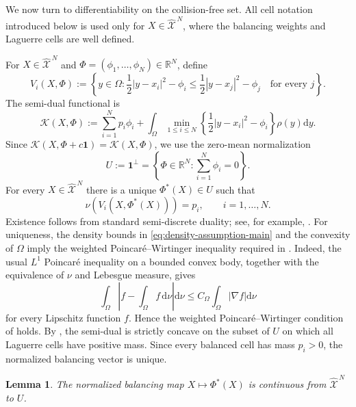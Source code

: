 \documentclass[11pt]{article}
\def\R{\mathbb{R}}
\def\Xc{{\mathcal X}}
\def\hX{\widehat{\Xc}^{\,N}}
\newcommand{\dd}{\mathrm{d}}
\newcommand{\one}{\mathbf 1}
\newcommand{\Kant}{\mathscr K}
\newtheorem{lemma}[theorem]{Lemma}
\theoremstyle{definition}
\theoremstyle{remark}
\numberwithin{equation}{section}
\begin{document}
We now turn to differentiability on the collision-free set.  All cell notation introduced below is
used only for $X\in\hX$, where the balancing weights and Laguerre cells are well defined.

For $X\in\hX$ and $\Phi=(\phi_1,\ldots,\phi_N)\in\R^N$, define
\begin{equation}\label{eq:laguerre-main}
 V_i(X,\Phi):=\left\{y\in\Omega:
 \frac12|y-x_i|^2-\phi_i
 \le\frac12|y-x_j|^2-\phi_j\quad\text{for every }j\right\}.
\end{equation}
The semi-dual functional is
\begin{equation}\label{eq:semi-dual-main}
 \Kant(X,\Phi):=\sum_{i=1}^Np_i\phi_i+
 \int_\Omega\min_{1\le i\le N}
 \left\{\frac12|y-x_i|^2-\phi_i\right\}\rho(y)\dd y.
\end{equation}
Since $\Kant(X,\Phi+c\one)=\Kant(X,\Phi)$, we use the zero-mean normalization
\begin{equation}\label{eq:gauge-main}
 U:=\one^\perp=\left\{\Phi\in\R^N:\sum_{i=1}^N\phi_i=0\right\}.
\end{equation}
For every $X\in\hX$ there is a unique $\Phi^*(X)\in U$ such that
\begin{equation}\label{eq:balanced-main}
 \nu(V_i(X,\Phi^*(X)))=p_i,
 \qquad i=1,\ldots,N.
\end{equation}
Existence follows from standard semi-discrete duality; see, for example,
\cite[Chapter 5]{Villani2009}.  For uniqueness, the density bounds in
\eqref{eq:density-assumption-main} and the convexity of $\Omega$ imply the weighted
Poincar\'e--Wirtinger inequality required in
\cite[Theorems 1.1 and 1.4]{KitagawaMerigotThibert2019}.  Indeed, the usual $L^1$ Poincar\'e
inequality on a bounded convex body, together with the equivalence of $\nu$ and Lebesgue measure,
gives
\[
 \int_\Omega\left|f-\int_\Omega f\,\dd\nu\right|\dd\nu
 \le C_\Omega\int_\Omega|\nabla f|\dd\nu
\]
for every Lipschitz function $f$.
Hence the weighted Poincar\'e--Wirtinger condition of
\cite{KitagawaMerigotThibert2019} holds.  By
\cite[Theorem~1.4]{KitagawaMerigotThibert2019}, the semi-dual is
strictly concave on the subset of $U$ on which all Laguerre cells
have positive mass.  Since every balanced cell has mass $p_i>0$,
the normalized balancing vector is unique.


\begin{lemma}\label{lem:weight-continuity}
The normalized balancing map $X\mapsto\Phi^*(X)$ is continuous from $\hX$ to $U$.
\end{lemma}
\end{document}
